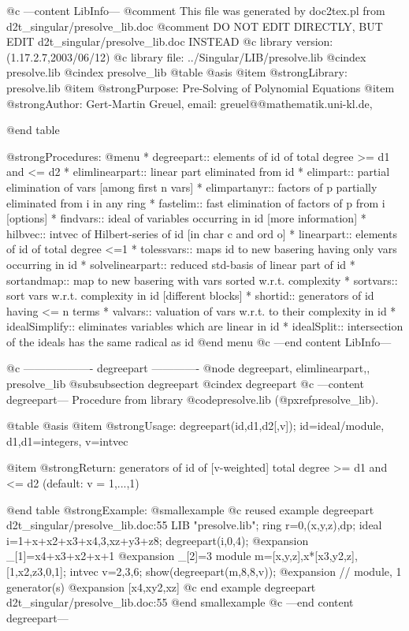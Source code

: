 @c ---content LibInfo---
@comment This file was generated by doc2tex.pl from d2t_singular/presolve_lib.doc
@comment DO NOT EDIT DIRECTLY, BUT EDIT d2t_singular/presolve_lib.doc INSTEAD
@c library version: (1.17.2.7,2003/06/12)
@c library file: ../Singular/LIB/presolve.lib
@cindex presolve.lib
@cindex presolve_lib
@table @asis
@item @strong{Library:}
presolve.lib
@item @strong{Purpose:}
     Pre-Solving of Polynomial Equations
@item @strong{Author:}
Gert-Martin Greuel, email: greuel@@mathematik.uni-kl.de,

@end table

@strong{Procedures:}
@menu
* degreepart:: elements of id of total degree >= d1 and <= d2
* elimlinearpart:: linear part eliminated from id
* elimpart:: partial elimination of vars [among first n vars]
* elimpartanyr:: factors of p partially eliminated from i in any ring
* fastelim:: fast elimination of factors of p from i [options]
* findvars:: ideal of variables occurring in id [more information]
* hilbvec:: intvec of Hilbert-series of id [in char c and ord o]
* linearpart:: elements of id of total degree <=1
* tolessvars:: maps id to new basering having only vars occurring in id
* solvelinearpart:: reduced std-basis of linear part of id
* sortandmap:: map to new basering with vars sorted w.r.t. complexity
* sortvars:: sort vars w.r.t. complexity in id [different blocks]
* shortid:: generators of id having <= n terms
* valvars:: valuation of vars w.r.t. to their complexity in id
* idealSimplify:: eliminates variables which are linear in id
* idealSplit:: intersection of the ideals has the same radical as id
@end menu
@c ---end content LibInfo---

@c ------------------- degreepart -------------
@node degreepart, elimlinearpart,, presolve_lib
@subsubsection degreepart
@cindex degreepart
@c ---content degreepart---
Procedure from library @code{presolve.lib} (@pxref{presolve_lib}).

@table @asis
@item @strong{Usage:}
degreepart(id,d1,d2[,v]); id=ideal/module, d1,d1=integers, v=intvec

@item @strong{Return:}
generators of id of [v-weighted] total degree >= d1 and <= d2
(default: v = 1,...,1)

@end table
@strong{Example:}
@smallexample
@c reused example degreepart d2t_singular/presolve_lib.doc:55 
LIB "presolve.lib";
ring r=0,(x,y,z),dp;
ideal i=1+x+x2+x3+x4,3,xz+y3+z8;
degreepart(i,0,4);
@expansion{} _[1]=x4+x3+x2+x+1
@expansion{} _[2]=3
module m=[x,y,z],x*[x3,y2,z],[1,x2,z3,0,1];
intvec v=2,3,6;
show(degreepart(m,8,8,v));
@expansion{} // module, 1 generator(s)
@expansion{} [x4,xy2,xz]
@c end example degreepart d2t_singular/presolve_lib.doc:55
@end smallexample
@c ---end content degreepart---

